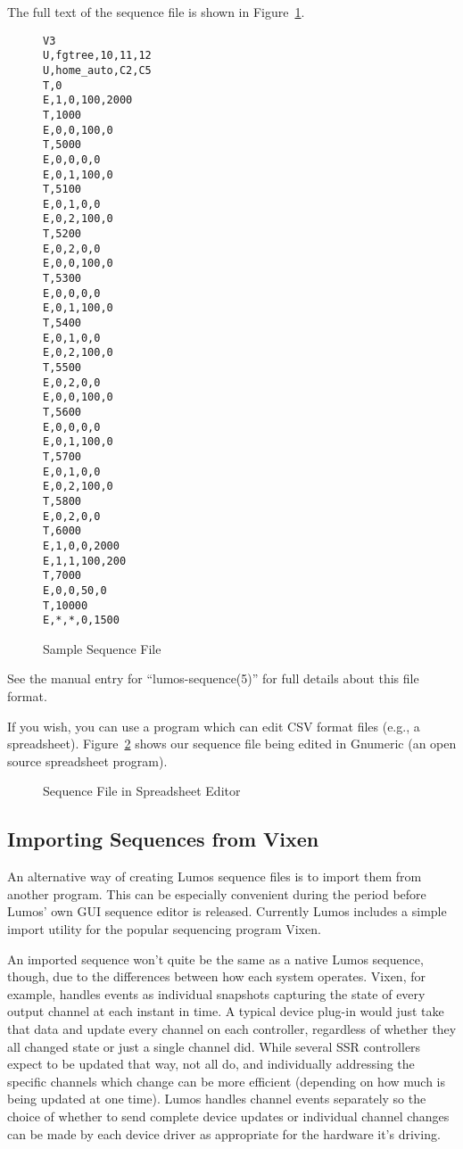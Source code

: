 \documentclass{article}
\begin{document}
The full text of the sequence file is shown in Figure~\ref{seq:all}.

\begin{figure}[p]
\begin{verbatim}
V3
U,fgtree,10,11,12
U,home_auto,C2,C5
T,0
E,1,0,100,2000
T,1000
E,0,0,100,0
T,5000
E,0,0,0,0
E,0,1,100,0
T,5100
E,0,1,0,0
E,0,2,100,0
T,5200
E,0,2,0,0
E,0,0,100,0
T,5300
E,0,0,0,0
E,0,1,100,0
T,5400
E,0,1,0,0
E,0,2,100,0
T,5500
E,0,2,0,0
E,0,0,100,0
T,5600
E,0,0,0,0
E,0,1,100,0
T,5700
E,0,1,0,0
E,0,2,100,0
T,5800
E,0,2,0,0
T,6000
E,1,0,0,2000
E,1,1,100,200
T,7000
E,0,0,50,0
T,10000
E,*,*,0,1500
\end{verbatim}
\caption{Sample Sequence File}
\label{seq:all}
\end{figure}

See the manual entry for ``lumos-sequence(5)'' for full details about this
file format.

If you wish, you can use a program which can edit CSV format files (e.g., a
spreadsheet).  Figure~\ref{seq:ss} shows our sequence file being edited in
Gnumeric (an open source spreadsheet program).

\begin{figure}[p]
\caption{Sequence File in Spreadsheet Editor}
\label{seq:ss}
\end{figure}

\subsection{Importing Sequences from Vixen}
An alternative way of creating Lumos sequence files is to import them from
another program.  This can be especially convenient during the period before
Lumos' own GUI sequence editor is released.  Currently Lumos includes a simple 
import utility for the popular sequencing program Vixen.  

An imported sequence won't quite be the same as a native Lumos sequence,
though, due to the differences between how each system operates.  
Vixen, for example, handles events as individual snapshots capturing the state of every output channel at each instant in time. A typical device plug-in would just take that data and update every channel on each controller, regardless of whether they all changed state or just a single channel did. While several SSR controllers expect to be updated that way, not all do, and individually addressing the specific channels which change can be more efficient (depending on how much is being updated at one time). Lumos handles channel events separately so the choice of whether to send complete device updates or individual channel changes can be made by each device driver as appropriate for the hardware it's driving.
\end{document}
